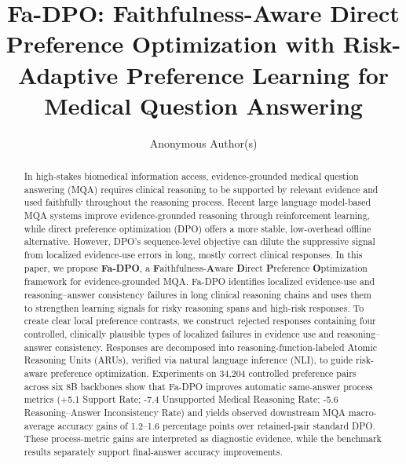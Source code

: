 \documentclass[a4paper,fleqn,doubleblind]{cas-sc}
\begin{document}
\let\WriteBookmarks\relax
\def\floatpagepagefraction{1}
\def\textpagefraction{.001}


\title[mode=title]{Fa-DPO: Faithfulness-Aware Direct Preference Optimization with Risk-Adaptive Preference Learning for Medical Question Answering}

\author[1]{Anonymous Author(s)}

\begin{abstract}
In high-stakes biomedical information access, evidence-grounded medical question answering (MQA) requires clinical reasoning to be supported by relevant evidence and used faithfully throughout the reasoning process.
Recent large language model-based MQA systems improve evidence-grounded reasoning through reinforcement learning, while direct preference optimization (DPO) offers a more stable, low-overhead offline alternative.
However, DPO's sequence-level objective can dilute the suppressive signal from localized evidence-use errors in long, mostly correct clinical responses.
In this paper, we propose \textbf{Fa-DPO}, a \textbf{F}aithfulness-\textbf{A}ware \textbf{D}irect \textbf{P}reference \textbf{O}ptimization framework for evidence-grounded MQA.
Fa-DPO identifies localized evidence-use and reasoning--answer consistency failures in long clinical reasoning chains and uses them to strengthen learning signals for risky reasoning spans and high-risk responses.
To create clear local preference contrasts, we construct rejected responses containing four controlled, clinically plausible types of localized failures in evidence use and reasoning--answer consistency.
Responses are decomposed into reasoning-function-labeled Atomic Reasoning Units (ARUs), verified via natural language inference (NLI), to guide risk-aware preference optimization.
Experiments on 34,204 controlled preference pairs across six 8B backbones show that Fa-DPO improves automatic same-answer process metrics (+5.1 Support Rate; -7.4 Unsupported Medical Reasoning Rate; -5.6 Reasoning--Answer Inconsistency Rate) and yields observed downstream MQA macro-average accuracy gains of 1.2--1.6 percentage points over retained-pair standard DPO. These process-metric gains are interpreted as diagnostic evidence, while the benchmark results separately support final-answer accuracy improvements.
\end{abstract}
\end{document}

